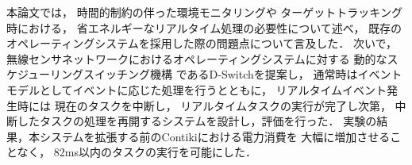 本論文では，
時間的制約の伴った環境モニタリングや
ターゲットトラッキング時における，
省エネルギーなリアルタイム処理の必要性について述べ，
既存のオペレーティングシステムを採用した際の問題点について言及した．
次いで，
無線センサネットワークにおけるオペレーティングシステムに対する
動的なスケジューリングスイッチング機構
であるD-Switchを提案し，
通常時はイベントモデルとしてイベントに応じた処理を行うとともに，
リアルタイムイベント発生時には
現在のタスクを中断し，
リアルタイムタスクの実行が完了し次第，
中断したタスクの処理を再開するシステムを設計し，評価を行った．
実験の結果，本システムを拡張する前のContikiにおける電力消費を
大幅に増加させることなく，
82ms以内のタスクの実行を可能にした．



